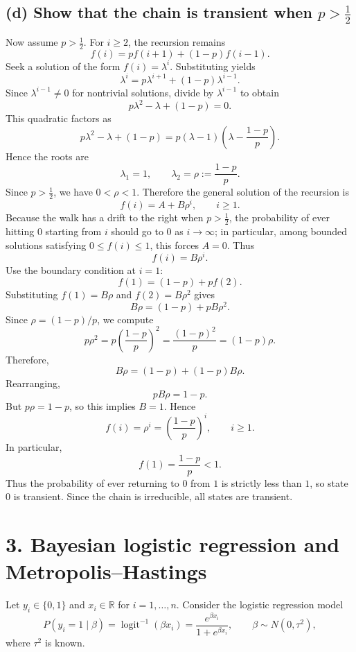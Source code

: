 \documentclass[11pt]{article}
\begin{document}
\subsection*{(d) Show that the chain is transient when $p>\tfrac12$}
Now assume $p>\frac12$. For $i\ge2$, the recursion remains
\[
f(i)=pf(i+1)+(1-p)f(i-1).
\]
Seek a solution of the form $f(i)=\lambda^i$. Substituting yields
\[
\lambda^i=p\lambda^{i+1}+(1-p)\lambda^{i-1}.
\]
Since $\lambda^{i-1}\neq0$ for nontrivial solutions, divide by $\lambda^{i-1}$ to obtain
\[
p\lambda^2-\lambda+(1-p)=0.
\]
This quadratic factors as
\[
p\lambda^2-\lambda+(1-p)=p(\lambda-1)\left(\lambda-\frac{1-p}{p}\right).
\]
Hence the roots are
\[
\lambda_1=1,
\qquad
\lambda_2=\rho:=\frac{1-p}{p}.
\]
Since $p>\frac12$, we have $0<\rho<1$. Therefore the general solution of the recursion is
\[
f(i)=A+B\rho^i,\qquad i\ge1.
\]
Because the walk has a drift to the right when $p>\frac12$, the probability of ever hitting $0$ starting from $i$ should go to $0$ as $i\to\infty$; in particular, among bounded solutions satisfying $0\le f(i)\le1$, this forces $A=0$. Thus
\[
f(i)=B\rho^i.
\]
Use the boundary condition at $i=1$:
\[
f(1)=(1-p)+pf(2).
\]
Substituting $f(1)=B\rho$ and $f(2)=B\rho^2$ gives
\[
B\rho=(1-p)+pB\rho^2.
\]
Since $\rho=(1-p)/p$, we compute
\[
p\rho^2=p\left(\frac{1-p}{p}\right)^2=\frac{(1-p)^2}{p}=(1-p)\rho.
\]
Therefore,
\[
B\rho=(1-p)+(1-p)B\rho.
\]
Rearranging,
\[
pB\rho=1-p.
\]
But $p\rho=1-p$, so this implies $B=1$. Hence
\[
f(i)=\rho^i=\left(\frac{1-p}{p}\right)^i,
\qquad i\ge1.
\]
In particular,
\[
f(1)=\frac{1-p}{p}<1.
\]
Thus the probability of ever returning to $0$ from $1$ is strictly less than $1$, so state $0$ is transient. Since the chain is irreducible, all states are transient.

\newpage
\section*{3. Bayesian logistic regression and Metropolis--Hastings}

Let $y_i\in\{0,1\}$ and $x_i\in\mathbb R$ for $i=1,\dots,n$. Consider the logistic regression model
\[
P(y_i=1\mid \beta)=\operatorname{logit}^{-1}(\beta x_i)=\frac{e^{\beta x_i}}{1+e^{\beta x_i}},
\qquad \beta\sim N(0,\tau^2),
\]
where $\tau^2$ is known.
\end{document}
